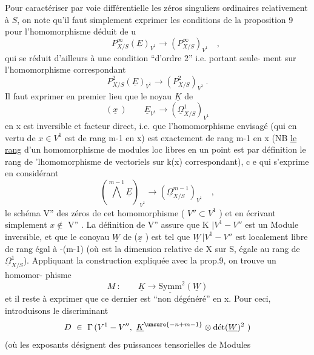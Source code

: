 
Pour caractériser par voie différentielle  les  zéros singuliers ordinaires
relativement à $S$,  on note qu'il faut simplement exprimer  les conditions
de la proposition 9  pour  l'homomorphisme  déduit de u
\[  \qquad P^{\infty}_{X/S}(\underline{E})_{V^1}\to(P^{\infty}_{X/S})_{V^1} \quad , \]
qui se réduit d'ailleurs à une condition  ``d'ordre 2'' i.e. portant seule-%
ment sur l'homomorphisme correspondant
\[ P^{2}_{X/S}(\underline{E})_{V^1}\to(P^{2}_{X/S})_{V^1} \ . \]
Il faut exprimer en premier lieu  que  le noyau $\underline{K}$ de
\[ (\underline{x}\ ) \qquad \underline{E}_{V^1} \longrightarrow (\underline{\Omega}^{1}_{X/S})_{V^1} \]
en x est inversible et facteur direct, i.e. que l'homomorphisme envisagé
(qui en vertu de  $x\in V^1$ est  de rang  m-1 en x) est exactement de rang
\placedmargin{(} m-1 en x  (NB \uline{le rang} d'un  homomorphisme de modules loc libres en un
point est par définition le rang de 'lhomomorphisme de vectoriels sur k(x)
correspondant), c e qui s'exprime en considérant
\[ (\bigwedge^{m-1} \underline{E})_{V^1}\to(\underline{\Omega}^{m-1}_{X/S})_{V^1} \quad , \]
le  schéma  V'' des zéros de cet homomorphisme  ( $V''\subset V^1$ )  et en écrivant
simplement $x\notin$ V'' .  La définition de V'' assure que  K $|V^1-V''$  est un
Module inversible,  et que  le conoyau  $\underline{W}$  de ($\underline{x}$ )  est tel que
$\underline{W}\,|V^1-V''$  est  localement libre de rang égal à  -(m-1)  (où  est la
dimension relative de X sur S, égale au rang de $\underline{\Omega}^{1}_{X/S}$).  Appliquant la
construction expliquée avec la prop.9\hand{$^{*}$}, on trouve  un homomor-%
phisme
\[ M\ : \qquad \underline{K} \longrightarrow \underline{\mathrm{Symm}}^{2}(\underline{W}) \]
et il reste à exprimer que ce dernier est ``non dégénéré'' en x. Pour ceci,
introduisons le  discriminant
\[ D\ \in\ \Gamma\,(V^1-V'',\ \underline{K}^{\unsure{-n+m-1}}\otimes \text{dét}(\underline{W})^{2}\ ) \]
(où les exposants désignent des puissances tensorielles de Modules

